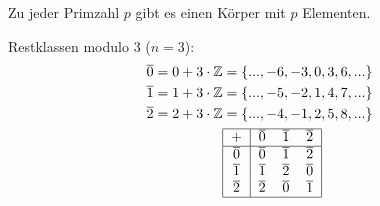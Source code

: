 \begin{kor}
	Zu jeder Primzahl $p$ gibt es einen Körper mit $p$ Elementen.
\end{kor}

\begin{bsp}
	Restklassen modulo 3 ($n=3$):
	\begin{align*}
	\overline{0}=0+3\cdot\ZZ &=\{...,-6,-3,0,3,6,...\}\\
	\overline{1}=1+3\cdot\ZZ &=\{...,-5,-2,1,4,7,...\}\\
	\overline{2}=2+3\cdot\ZZ &=\{...,-4,-1,2,5,8,...\} \\
	&\begin{tabular}{|c|ccc|}
	\hline
	+&$\overline{0}$&$\overline{1}$&$\overline{2}$\\
	\hline
	$\overline{0}$ & $\overline{0}$ &$ \overline{1}$ & $\overline{2}$\\
	$\overline{1}$ &$ \overline{1}$ & $\overline{2}$ & $\overline{0}$\\
	$\overline{2}$ &$ \overline{2}$ & $\overline{0}$ & $\overline{1}$\\
	\hline
	\end{tabular}
	\end{align*}
\end{bsp}

